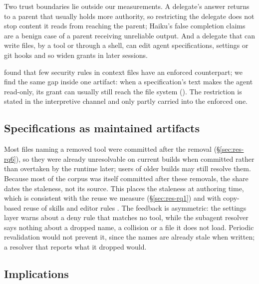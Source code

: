 Two trust boundaries lie outside our measurements. A delegate's answer returns to a parent that usually holds more
authority, so restricting the delegate does not stop content it reads from reaching the parent; Haiku's false
completion claims are a benign case of a parent receiving unreliable output. And a delegate that can write files, by
a tool or through a shell, can edit agent specifications, settings or git hooks and so widen grants in later
sessions.

\citet{Yan2026DoNotDeny} found that few security rules in context files have an enforced counterpart; we find the
same gap inside one artifact: when a specification's text makes the agent read-only, its grant can usually still reach
the file system (\RQfourFullReaches{}). The restriction is stated in the interpretive channel and only partly carried
into the enforced one.

\subsection{Specifications as maintained artifacts}
\label{sec:disc-drift}

Most files naming a removed tool were committed after the removal (\S\ref{sec:res-rq6}), so they were already
unresolvable on current builds when committed rather than overtaken by the runtime later; users of older builds may
still resolve them. Because most of the corpus was itself committed after these removals, the share dates the
staleness, not its source. This places the staleness at authoring time, which is consistent with the reuse we measure
(\S\ref{sec:res-rq1}) and with copy-based reuse of skills and editor rules
\citep{Destefanis2026GitSkills,Jiang2026CursorRules}. The feedback is asymmetric: the settings layer warns about a deny
rule that matches no tool, while the subagent resolver says nothing about a dropped name, a collision or a file it
does not load. Periodic revalidation would not prevent it, since the names are already stale when written; a resolver that
reports what it dropped would.

\subsection{Implications}
\label{sec:disc-implications}

